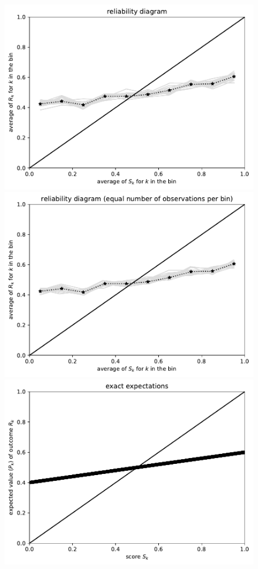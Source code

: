 \documentclass{article}
\begin{document}
\begin{figure}
\begin{centering}
\parbox{\imsize}{\includegraphics[width=\imsize]
                {./codes/unweighted/10000_10_0_0/equiprob.pdf}}
\quad\quad
\parbox{\imsize}{\includegraphics[width=\imsize]
                {./codes/unweighted/10000_10_0_0/equisamp.pdf}}

\vspace{\vertsep}

\parbox{\imsize}{\includegraphics[width=\imsize]
                {./codes/unweighted/10000_10_0_0/exact.pdf}}


\end{centering}
\end{figure}
\end{document}
